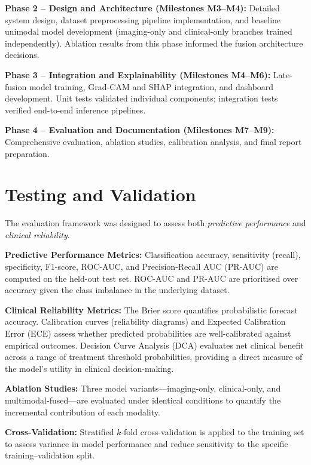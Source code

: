 {\textbf{Phase 2 -- Design and Architecture (Milestones M3--M4):} Detailed system design, dataset preprocessing pipeline implementation, and baseline unimodal model development (imaging-only and clinical-only branches trained independently). Ablation results from this phase informed the fusion architecture decisions.

\textbf{Phase 3 -- Integration and Explainability (Milestones M4--M6):} Late-fusion model training, Grad-CAM and SHAP integration, and dashboard development. Unit tests validated individual components; integration tests verified end-to-end inference pipelines.

\textbf{Phase 4 -- Evaluation and Documentation (Milestones M7--M9):} Comprehensive evaluation, ablation studies, calibration analysis, and final report preparation.


\section{Testing and Validation}

The evaluation framework was designed to assess both \textit{predictive performance} and \textit{clinical reliability}.

\textbf{Predictive Performance Metrics:} Classification accuracy, sensitivity (recall), specificity, F1-score, ROC-AUC, and Precision-Recall AUC (PR-AUC) are computed on the held-out test set. ROC-AUC and PR-AUC are prioritised over accuracy given the class imbalance in the underlying dataset.

\textbf{Clinical Reliability Metrics:} The Brier score quantifies probabilistic forecast accuracy. Calibration curves (reliability diagrams) and Expected Calibration Error (ECE) assess whether predicted probabilities are well-calibrated against empirical outcomes. Decision Curve Analysis (DCA) evaluates net clinical benefit across a range of treatment threshold probabilities, providing a direct measure of the model's utility in clinical decision-making.

\textbf{Ablation Studies:} Three model variants---imaging-only, clinical-only, and multimodal-fused---are evaluated under identical conditions to quantify the incremental contribution of each modality.

\textbf{Cross-Validation:} Stratified $k$-fold cross-validation is applied to the training set to assess variance in model performance and reduce sensitivity to the specific training--validation split.

}
